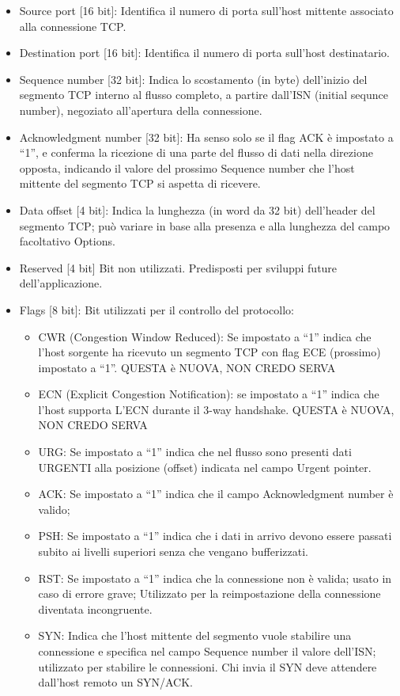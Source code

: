 \begin{itemize}
\item	Source port [16 bit]: Identifica il numero di porta sull’host mittente associato alla connessione TCP.
\item	Destination port [16 bit]: Identifica il numero di porta sull’host destinatario.
\item	Sequence number [32 bit]: Indica lo scostamento (in byte) dell’inizio del segmento TCP interno al flusso completo, a partire dall’ISN (initial sequnce number), negoziato all’apertura della connessione.
\item	Acknowledgment number [32 bit]: Ha senso solo se il flag ACK è impostato a “1”, e conferma la ricezione di una parte del flusso di dati nella direzione opposta, indicando il valore del prossimo Sequence number che l’host mittente del segmento TCP si aspetta di ricevere.
\item	Data offset [4 bit]: Indica la lunghezza (in word da 32 bit) dell’header del segmento TCP; può variare in base alla presenza e alla lunghezza del campo facoltativo Options.
\item	Reserved [4 bit] Bit non utilizzati. Predisposti per sviluppi future dell’applicazione.
\item	Flags [8 bit]: Bit utilizzati per il controllo del protocollo:
\begin{itemize}
\item	CWR (Congestion Window Reduced): Se impostato a “1” indica che l’host sorgente ha ricevuto un segmento TCP con flag ECE (prossimo) impostato a “1”. 
QUESTA è NUOVA, NON CREDO SERVA
\item	ECN (Explicit Congestion Notification): se impostato a “1” indica che l’host supporta L’ECN durante il 3-way handshake. QUESTA è NUOVA, NON CREDO SERVA
\item	URG: Se impostato a “1” indica che nel flusso sono presenti dati URGENTI alla posizione (offset) indicata nel campo Urgent pointer.
\item	ACK: Se impostato a “1” indica che il campo Acknowledgment number è valido;
\item	PSH: Se impostato a “1” indica che i dati in arrivo devono essere passati subito ai livelli superiori senza che vengano bufferizzati.
\item	RST: Se impostato a “1” indica che la connessione non è valida; usato in caso di errore grave; Utilizzato per la reimpostazione della connessione diventata incongruente.
\item	SYN: Indica che l’host mittente del segmento vuole stabilire una connessione e specifica nel campo Sequence number il valore dell’ISN; utilizzato per stabilire le connessioni. Chi invia il SYN deve attendere dall’host remoto un SYN/ACK.

\end{itemize}
\end{itemize}
